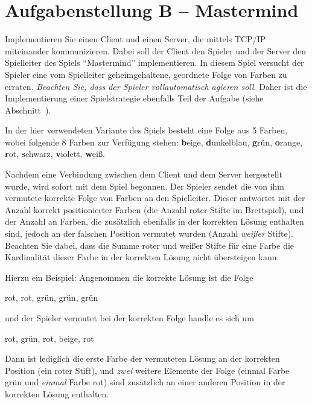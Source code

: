 

\usepackage{bytefield}

\newcommand{\baselinecenterit}[1]{%
  \centering
  \raisebox{0pt}[\heightof{W}][0pt]{\itshape #1}%
}


\sloppy
{}

\section*{Aufgabenstellung B -- Mastermind}\label{sec:aufgabenstellung}
Implementieren Sie einen Client und einen Server, die mittels TCP/IP
miteinander kommunizieren. Dabei soll der Client den Spieler und der Server den
Spielleiter des Spiels ``Mastermind'' implementieren. In diesem Spiel versucht
der Spieler eine vom Spielleiter geheimgehaltene, geordnete Folge von Farben zu
erraten. \emph{Beachten Sie, dass der Spieler vollautomatisch agieren soll}. Daher
ist die Implementierung einer Spielstrategie ebenfalls Teil der Aufgabe
(siehe Abschnitt~).

In der hier verwendeten Variante des Spiels besteht eine Folge aus 5 Farben,
wobei folgende 8 Farben zur Verfügung stehen:
\textbf{b}eige,
\textbf{d}unkelblau,
\textbf{g}rün,
\textbf{o}range,
\textbf{r}ot,
\textbf{s}chwarz,
\textbf{v}iolett,
\textbf{w}eiß.

Nachdem eine Verbindung zwischen dem Client und dem Server hergestellt wurde,
wird sofort mit dem Spiel begonnen. Der Spieler sendet die von ihm vermutete
korrekte Folge von Farben an den Spielleiter. Dieser antwortet mit der Anzahl
korrekt positionierter Farben (die Anzahl roter Stifte im Brettspiel), und der
Anzahl an Farben, die zusätzlich ebenfalls in der korrekten Lösung enthalten
sind, jedoch an der falschen Position vermutet wurden (Anzahl \emph{weißer}
Stifte). Beachten Sie dabei, dass die Summe roter und weißer Stifte für eine
Farbe die Kardinalität dieser Farbe in der korrekten Lösung nicht übersteigen
kann.

Hierzu ein Beispiel: Angenommen die korrekte Lösung ist die Folge
\begin{osuefmtcode}
  rot, rot, grün, grün, grün
\end{osuefmtcode}
und der Spieler vermutet bei der korrekten Folge handle es sich um
\begin{osuefmtcode}
  rot, grün, rot, beige, rot
\end{osuefmtcode}
Dann ist lediglich die erste Farbe der vermuteten Lösung an der korrekten
Position (ein roter Stift), und \emph{zwei} weitere Elemente der Folge (einmal
Farbe grün und \emph{einmal} Farbe rot) sind zusätzlich an einer anderen
Position in der korrekten Lösung enthalten.

